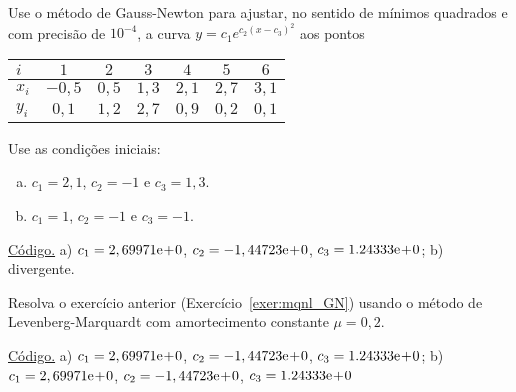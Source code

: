 \begin{exer}\label{exer:mqnl_GN}
  Use o método de Gauss-Newton para ajustar, no sentido de mínimos quadrados e com precisão de $10^{-4}$, a curva $y = c_1e^{c_2(x-c_3)^2}$ aos pontos
  \begin{center}
    \begin{tabular}{l|cccccc}
      $i$ & $1$ & $2$ & $3$ & $4$ & $5$ & $6$ \\\hline
      $x_i$ & $-0,5$ & $0,5$ & $1,3$ & $2,1$ & $2,7$ & $3,1$ \\
      $y_i$ & $0,1$ & $1,2$ & $2,7$ & $0,9$ & $0,2$ & $0,1$ \\\hline
    \end{tabular}
  \end{center}
Use as condições iniciais:
\begin{enumerate}[a)]
\item $c_1 = 2,1$, $c_2=-1$ e $c_3=1,3$.
\item $c_1=1$, $c_2=-1$ e $c_3=-1$.
\end{enumerate}
\end{exer}
\begin{resp}
  \ifisoctave 
  \href{https://github.com/phkonzen/notas/blob/master/src/MatematicaNumerica/cap_ajuste/dados/exer_mqnl_GN/exer_mqnl_GN.m}{Código.} 
  \fi
  a) $c_1 = 2,69971\mathrm{e}\!+\!0$, $c_2 = -1,44723\mathrm{e}\!+\!0$, $c_3 = 1.24333\mathrm{e}\!+\!0$; b) divergente.
\end{resp}

\begin{exer}
  Resolva o exercício anterior (Exercício~\ref{exer:mqnl_GN}) usando o método de Levenberg-Marquardt com amortecimento constante $\mu=0,2$.
\end{exer}
\begin{resp}
  \ifisoctave 
  \href{https://github.com/phkonzen/notas/blob/master/src/MatematicaNumerica/cap_ajuste/dados/exer_mqnl_LM/exer_mqnl_LM.m}{Código.} 
  \fi
  a)  $c_1 = 2,69971\mathrm{e}\!+\!0$, $c_2 = -1,44723\mathrm{e}\!+\!0$, $c_3 = 1.24333\mathrm{e}\!+\!0$; b) $c_1 = 2,69971\mathrm{e}\!+\!0$, $c_2 = -1,44723\mathrm{e}\!+\!0$, $c_3 = 1.24333\mathrm{e}\!+\!0$
\end{resp}
